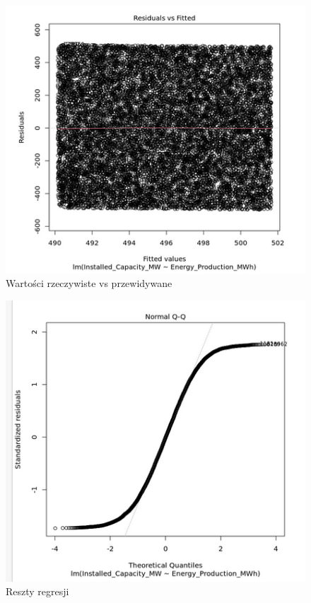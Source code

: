 \begin{figure}[H]
    \centering
    \includegraphics[width=1\linewidth]{lab1/obraz4.png}
    \caption{Wartości rzeczywiste vs przewidywane}
    \label{fig:real_vs_predicted}
\end{figure}

\begin{figure}[H]
    \centering
    \includegraphics[width=1\linewidth]{lab1/obraz5.png}
    \caption{Reszty regresji}
    \label{fig:residuals}
\end{figure}

